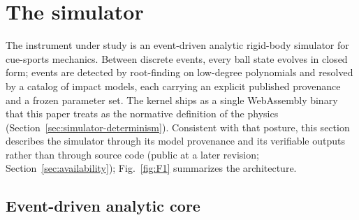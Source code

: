 \section{The simulator}
\label{sec:simulator}

The instrument under study is an event-driven analytic rigid-body simulator
for cue-sports mechanics. Between discrete events, every ball state evolves
in closed form; events are detected by root-finding on low-degree
polynomials and resolved by a catalog of impact models, each carrying an
explicit published provenance and a frozen parameter set. The kernel ships
as a single WebAssembly binary that this paper treats as the normative
definition of the physics (Section~\ref{sec:simulator-determinism}).
Consistent with that posture, this section describes the simulator through
its model provenance and its verifiable outputs rather than through source
code (public at a later revision; Section~\ref{sec:availability});
Fig.~\ref{fig:F1} summarizes the architecture.


\subsection{Event-driven analytic core}
\label{sec:simulator-core}

